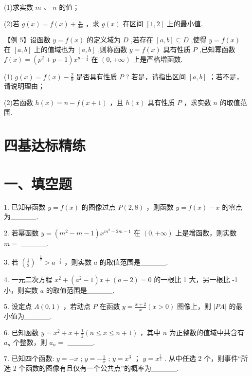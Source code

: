(1)求实数 $m$ 、 $n$ 的值；

(2)若 $g\left( x\right)  = f\left( x\right)  + \frac{a}{4x}$ ，求 $g\left( x\right)$ 在区间 $\left\lbrack  {1,2}\right\rbrack$ 上的最小值.

【例 5】设函数 $y = f\left( x\right)$ 的定义域为 $D$ ,若存在 $\left\lbrack  {a,b}\right\rbrack   \subseteq  D$ ,使得 $y = f\left( x\right)$ 在 $\left\lbrack  {a,b}\right\rbrack$ 上的值域也为 $\left\lbrack  {a,b}\right\rbrack$ ,则称函数 $y = f\left( x\right)$ 具有性质 $P$ ,已知幂函数 $f\left( x\right)  = \left( {{p}^{2} + p - 1}\right) {x}^{p - \frac{1}{2}}$ 在 $\left( {0, + \infty }\right)$ 上是严格增函数.

(1) $g\left( x\right)  = f\left( x\right)  - \frac{2}{9}$ 是否具有性质 $P$ ? 若是，请指出区间 $\left\lbrack  {a,b}\right\rbrack$ ；若不是，请说明理由；

(2)若函数 $h\left( x\right)  = n - f\left( {x + 1}\right)$ ，且 $h\left( x\right)$ 具有性质 $P$ ，求实数 $n$ 的取值范围.

\section*{四基达标精练}

\section*{一、填空题}

1. 已知幂函数 $y = f\left( x\right)$ 的图像过点 $P\left( {2,8}\right)$ ，则函数 $y = f\left( x\right)  - x$ 的零点为\_\_\_\_\_.

2. 若幂函数 $y = \left( {{m}^{2} - m - 1}\right) {x}^{{m}^{2} - {2m} - 1}$ 在 $\left( {0, + \infty }\right)$ 上是增函数，则实数 $m =$ \_\_\_\_\_.

3. 若 ${\left( \frac{1}{2}\right) }^{-\frac{1}{2}} > {a}^{-\frac{1}{2}}$ ，则实数 $a$ 的取值范围是\_\_\_\_\_.

4. 一元二次方程 ${x}^{2} + \left( {{a}^{2} - 1}\right) x + \left( {a - 2}\right)  = 0$ 的一根比 1 大，另一根比 -1 小，则实数 $a$ 的取值范围是\_\_\_\_\_.

5. 设定点 $A\left( {0,1}\right)$ ，若动点 $P$ 在函数 $y = \frac{x + 2}{x}\left( {x > 0}\right)$ 图像上，则 $\left| {PA}\right|$ 的最小值为\_\_\_\_\_.

6. 已知函数 $y = {x}^{2} + x + \frac{1}{2}\left( {n \leq  x \leq  n + 1}\right)$ ，其中 $n$ 为正整数的值域中共含有 ${a}_{n}$ 个整数，则 ${a}_{n} =$ \_\_\_\_\_.

7. 已知四个函数:   $y =  - x$ ;    $y =  - \frac{1}{x}$ ;    $y = {x}^{3}$ ；   $y = {x}^{\frac{1}{2}}$ . 从中任选 2 个，则事件“所选 2 个函数的图像有且仅有一个公共点”的概率为\_\_\_\_\_.

